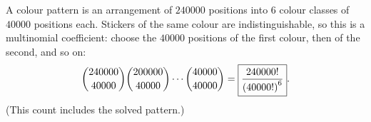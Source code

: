 A colour pattern is an arrangement of $240000$ positions into $6$ colour classes of $40000$ positions each. Stickers of the same colour are indistinguishable, so this is a multinomial coefficient: choose the $40000$ positions of the first colour, then of the second, and so on:
\[\dbinom{240000}{40000}\dbinom{200000}{40000}\cdots\dbinom{40000}{40000}=\boxed{\dfrac{240000!}{\left(40000!\right)^6}}.\]
(This count includes the solved pattern.)
